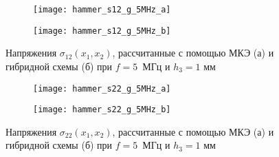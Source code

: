 \documentclass[press]{vestnik}
\begin{document}
\begin{figure}
	\centering
	\begin{subfigure}{.95\textwidth}
		\texttt{[image: hammer\_s12\_g\_5MHz\_a]}
		\caption{}\label{s12a}
	\end{subfigure}
		\begin{subfigure}{.95\textwidth}
		\texttt{[image: hammer\_s12\_g\_5MHz\_b]}
		\caption{}\label{s12b}
	\end{subfigure}
		\caption{Напряжения $\sigma_{12}(x_{1},x_{2})$, рассчитанные с помощью МКЭ (а) и гибридной схемы (б) при $f=5$~МГц и $h_{3}=1$ мм}
		 \label{s12}
\end{figure}

\begin{figure}
	\centering
	\begin{subfigure}{.95\textwidth}
		\texttt{[image: hammer\_s22\_g\_5MHz\_a]}
		\caption{}\label{s22a}
	\end{subfigure}
		\begin{subfigure}{.95\textwidth}
		\texttt{[image: hammer\_s22\_g\_5MHz\_b]}
		\caption{}\label{s22b}
	\end{subfigure}
		\caption{Напряжения $\sigma_{22}(x_{1},x_{2})$, рассчитанные с помощью МКЭ (а) и гибридной схемы (б) при $f= 5$~МГц и $h_{3}=1$ мм}
		 \label{s22}
\end{figure}
\end{document}
